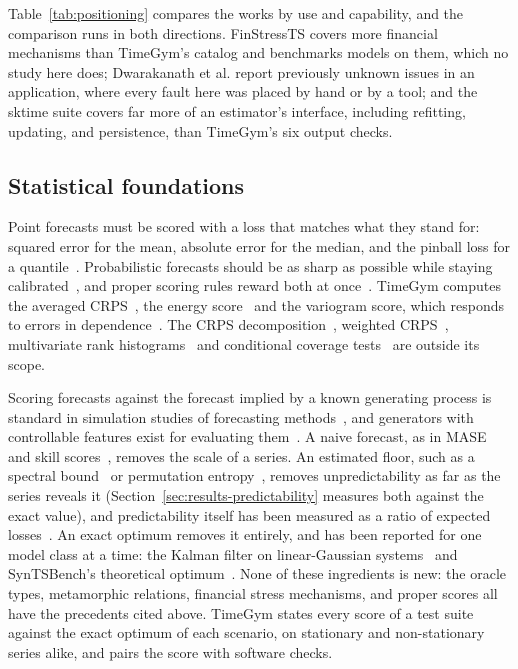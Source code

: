 \documentclass[11pt,a4paper]{article}
\begin{document}
Table~\ref{tab:positioning} compares the works by use and capability, and
the comparison runs in both directions. FinStressTS covers more financial
mechanisms than TimeGym's catalog and benchmarks models on them, which
no study here does; Dwarakanath et al. report previously unknown issues in
an application, where every fault here was placed by hand or by a tool;
and the sktime suite covers far more of
an estimator's interface, including refitting, updating, and persistence,
than TimeGym's six output checks.

\subsection{Statistical foundations}

Point forecasts must be scored with a loss that matches what they stand
for: squared error for the mean, absolute error for the median, and the
pinball loss for a
quantile~\cite{gneiting2011point,gneiting2011quantiles}. Probabilistic
forecasts should be as sharp as possible while staying
calibrated~\cite{gneiting2007probabilistic,gneiting2014probabilistic},
and proper scoring rules reward both at once~\cite{gneiting2007proper}.
TimeGym computes the averaged CRPS~\cite{matheson1976scoring}, the energy
score~\cite{gneiting2008assessing} and the variogram score, which responds
to errors in dependence~\cite{scheuerer2015variogram}. The CRPS
decomposition~\cite{hersbach2000decomposition}, weighted
CRPS~\cite{gneiting2011comparing}, multivariate rank
histograms~\cite{gneiting2008assessing} and conditional coverage
tests~\cite{christoffersen1998evaluating} are outside its scope.

Scoring forecasts against the forecast implied by a known generating
process is standard in simulation studies of forecasting
methods~\cite{clements1998forecasting}, and generators with controllable
features exist for evaluating them~\cite{kang2020gratis,gilpin2021chaos}.
A naive forecast, as in MASE and skill
scores~\cite{hyndman2006another,murphy1988skill}, removes the scale of a
series. An estimated floor, such as a spectral bound~\cite{feng2026beyond}
or permutation entropy~\cite{pennekamp2019intrinsic}, removes
unpredictability as far as the series reveals it
(Section~\ref{sec:results-predictability} measures both against the exact
value), and predictability itself has been measured as a ratio of expected
losses~\cite{diebold2001measuring}. An exact optimum removes it entirely,
and has been reported for one model class at a time: the Kalman filter on
linear-Gaussian systems~\cite{akram2026transformers} and SynTSBench's
theoretical optimum~\cite{tan2025syntsbench}.
None of these ingredients is new: the oracle types, metamorphic relations,
financial stress mechanisms, and proper scores all have the precedents
cited above. TimeGym states every score of a test suite against the exact
optimum of each scenario, on stationary and non-stationary series alike,
and pairs the score with software checks.
\end{document}
